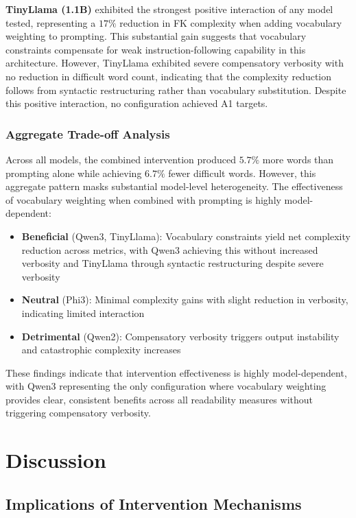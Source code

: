 \documentclass[10pt, a4paper]{article}
\begin{document}
\textbf{TinyLlama (1.1B)} exhibited the strongest positive interaction of any model tested, representing a $17\%$ reduction in FK complexity when adding vocabulary weighting to prompting. This substantial gain suggests that vocabulary constraints compensate for weak instruction-following capability in this architecture. However, TinyLlama exhibited severe compensatory verbosity with no reduction in difficult word count, indicating that the complexity reduction follows from syntactic restructuring rather than vocabulary substitution. Despite this positive interaction, no configuration achieved A1 targets.

\subsubsection{Aggregate Trade-off Analysis}

Across all models, the combined intervention produced $5.7\%$ more words than prompting alone while achieving $6.7\%$ fewer difficult words. However, this aggregate pattern masks substantial model-level heterogeneity. The effectiveness of vocabulary weighting when combined with prompting is highly model-dependent:

 \begin{itemize}
     \item \textbf{Beneficial} (Qwen3, TinyLlama): Vocabulary constraints yield net complexity reduction across metrics, with Qwen3 achieving this without increased verbosity and TinyLlama through syntactic restructuring despite severe verbosity
     \item \textbf{Neutral} (Phi3): Minimal complexity gains with slight reduction in verbosity, indicating limited interaction
     \item \textbf{Detrimental} (Qwen2): Compensatory verbosity triggers output instability and catastrophic complexity increases
 \end{itemize}

These findings indicate that intervention effectiveness is highly model-dependent, with Qwen3 representing the only configuration where vocabulary weighting provides clear, consistent benefits across all readability measures without triggering compensatory verbosity.

\section{Discussion}

\subsection{Implications of Intervention Mechanisms}
\end{document}
